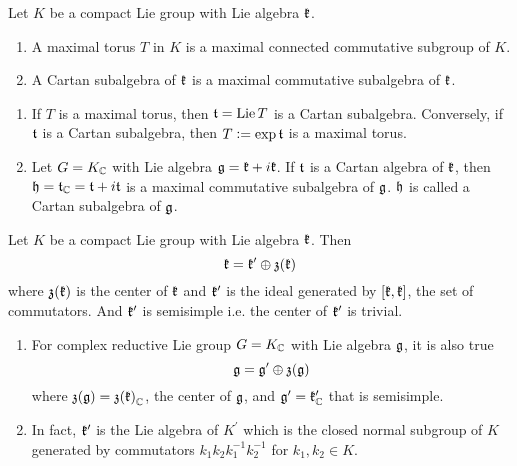 \documentclass[a4paper,12pt]{article}
\begin{document}
	\begin{defn}
		Let $K$ be a compact Lie group with Lie algebra $\mathfrak{k}$.
		\begin{enumerate}
			\item A maximal torus $T$ in $K$ is a maximal connected commutative subgroup of $K$.
			\item A Cartan subalgebra of $\mathfrak{k}$ is a maximal commutative subalgebra of $\mathfrak{k}$.
		\end{enumerate}
	\end{defn}
	\begin{rem}
		\begin{enumerate}
			\item If $T$ is a maximal torus, then $\mathfrak{t} = \operatorname{Lie} T$ is a Cartan subalgebra. Conversely, if $\mathfrak{t}$ is a Cartan subalgebra, then $T \vcentcolon= \exp \mathfrak{t}$ is a maximal torus.
			\item Let $G = K_{\mathbb{C}}$ with Lie algebra $\mathfrak{g} = \mathfrak{k} + i\mathfrak{k}$. If $\mathfrak{t}$ is a Cartan algebra of $\mathfrak{k}$, then $\mathfrak{h} = \mathfrak{t}_{\mathbb{C}} = \mathfrak{t} + i\mathfrak{t}$ is a maximal commutative subalgebra of $\mathfrak{g}$. $\mathfrak{h}$ is called a Cartan subalgebra of $\mathfrak{g}$.
		\end{enumerate}
	\end{rem}

	\begin{thm}
		Let $K$ be a compact Lie group with Lie algebra $\mathfrak{k}$. Then
		\begin{equation*}
			\mathfrak{k} = \mathfrak{k}^{\prime} \oplus \mathfrak{z(k)}
		\end{equation*}
		where $\mathfrak{z(k)}$ is the center of $\mathfrak{k}$ and $\mathfrak{k}^{\prime}$ is the ideal generated by $[\mathfrak{k},\mathfrak{k}]$, the set of commutators. And $\mathfrak{k}^{\prime}$ is semisimple i.e. the center of $\mathfrak{k}^{\prime}$ is trivial.
	\end{thm}
	\begin{rem}
		\begin{enumerate}
			\item For complex reductive Lie group $G=K_{\mathbb{C}}$ with Lie algebra $\mathfrak{g}$, it is also true
			\begin{equation*}
				\mathfrak{g} = \mathfrak{g}^{\prime} \oplus \mathfrak{z(g)}
			\end{equation*}
			where $\mathfrak{z(g)} = \mathfrak{z(k)}_{\mathbb{C}}$, the center of $\mathfrak{g}$, and $\mathfrak{g}^{\prime} = \mathfrak{k}^{\prime}_{\mathbb{C}}$ that is semisimple.
			\item In fact, $\mathfrak{k}^{\prime}$ is the Lie algebra of $K^{\prime}$ which is the closed normal subgroup of $K$ generated by commutators $k_1k_2k_1^{-1}k_2^{-1}$ for $k_1,k_2 \in K$.
		\end{enumerate}
	\end{rem}
\end{document}
